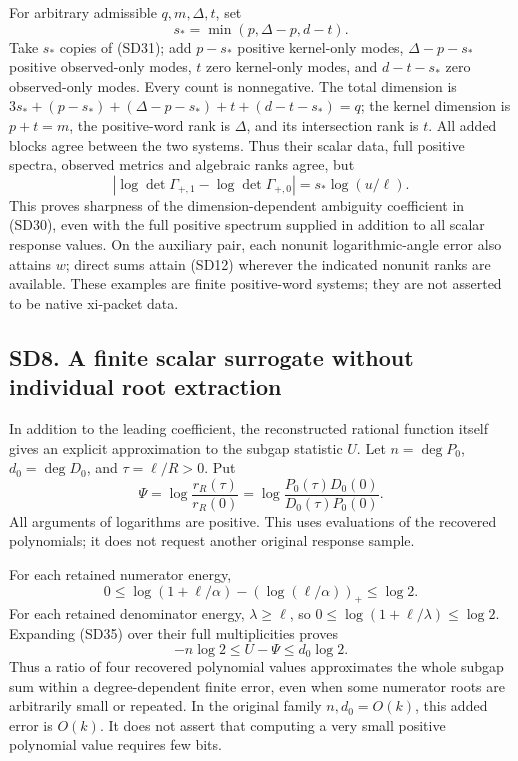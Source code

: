 \documentclass[11pt]{article}
\begin{document}
For arbitrary admissible \(q,m,\Delta,t\), set \[
s_*=\min(p,\Delta-p,d-t).
\tag{SD33}
\] Take \(s_*\) copies of (SD31); add \(p-s_*\) positive kernel-only modes, \(\Delta-p-s_*\) positive observed-only modes, \(t\) zero kernel-only modes, and \(d-t-s_*\) zero observed-only modes. Every count is nonnegative. The total dimension is \(3s_*+(p-s_*)+(\Delta-p-s_*)+t+(d-t-s_*)=q\); the kernel dimension is \(p+t=m\), the positive-word rank is \(\Delta\), and its intersection rank is \(t\). All added blocks agree between the two systems. Thus their scalar data, full positive spectra, observed metrics and algebraic ranks agree, but \[
\left|\log\det\Gamma_{+,1}-\log\det\Gamma_{+,0}\right|
=s_*\log(u/\ell).
\tag{SD34}
\] This proves sharpness of the dimension-dependent ambiguity coefficient in (SD30), even with the full positive spectrum supplied in addition to all scalar response values. On the auxiliary pair, each nonunit logarithmic-angle error also attains \(w\); direct sums attain (SD12) wherever the indicated nonunit ranks are available. These examples are finite positive-word systems; they are not asserted to be native xi-packet data.

\subsection{SD8. A finite scalar surrogate without individual root extraction}\label{sd8.-a-finite-scalar-surrogate-without-individual-root-extraction}

In addition to the leading coefficient, the reconstructed rational function itself gives an explicit approximation to the subgap statistic \(U\). Let \(n=\deg P_0\), \(d_0=\deg D_0\), and \(\tau=\ell/R>0\). Put \[
\Psi=\log\frac{r_R(\tau)}{r_R(0)}
=\log\frac{P_0(\tau)D_0(0)}{D_0(\tau)P_0(0)}.
\tag{SD35}
\] All arguments of logarithms are positive. This uses evaluations of the recovered polynomials; it does not request another original response sample.

For each retained numerator energy, \[
0\le\log(1+\ell/\alpha)-(\log(\ell/\alpha))_+\le\log2.
\] For each retained denominator energy, \(\lambda\ge\ell\), so \(0\le\log(1+\ell/\lambda)\le\log2\). Expanding (SD35) over their full multiplicities proves \[
-n\log2\le U-\Psi\le d_0\log2.
\tag{SD36}
\] Thus a ratio of four recovered polynomial values approximates the whole subgap sum within a degree-dependent finite error, even when some numerator roots are arbitrarily small or repeated. In the original family \(n,d_0=O(k)\), this added error is \(O(k)\). It does not assert that computing a very small positive polynomial value requires few bits.
\end{document}
